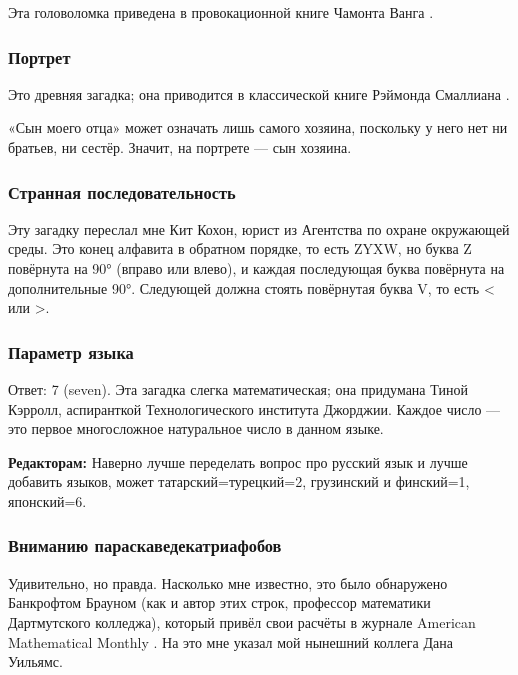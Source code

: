 Эта головоломка приведена в провокационной книге Чамонта Ванга \cite{58}.

\subsubsection*{Портрет}

Это древняя загадка;
она приводится в классической книге Рэймонда Смаллиана \cite{55}.

«Сын моего отца» может означать лишь самого хозяина, поскольку у него нет ни братьев, ни сестёр.
Значит, на портрете — сын хозяина.

\subsubsection*{Странная последовательность}

Эту загадку переслал мне Кит Кохон, юрист из Агентства по охране окружающей среды.
Это конец алфавита в обратном порядке, то есть ZYXW, но буква Z повёрнута на 90° (вправо или влево), и каждая последующая буква повёрнута на дополнительные 90°.
Следующей должна стоять повёрнутая буква V, то есть < или >.

\subsubsection*{Параметр языка}

Ответ: 7 (seven).
Эта загадка слегка математическая;
она придумана Тиной Кэрролл, аспиранткой Технологического института Джорджии. 
Каждое число — это первое многосложное натуральное число в данном языке.

\begin{addedbytheeditors}
\textbf{Редакторам:}
Наверно лучше переделать вопрос про русский язык и лучше добавить языков, может татарский=турецкий=2, грузинский и финский=1, японский=6.
\end{addedbytheeditors}


\subsubsection*{Вниманию параскаведекатриафобов}

Удивительно, но правда.
Насколько мне известно, это было обнаружено Банкрофтом Брауном (как и автор этих строк, профессор математики Дартмутского колледжа), который привёл свои расчёты в журнале American Mathematical Monthly \cite{11}.
На это мне указал мой нынешний коллега Дана Уильямс.

